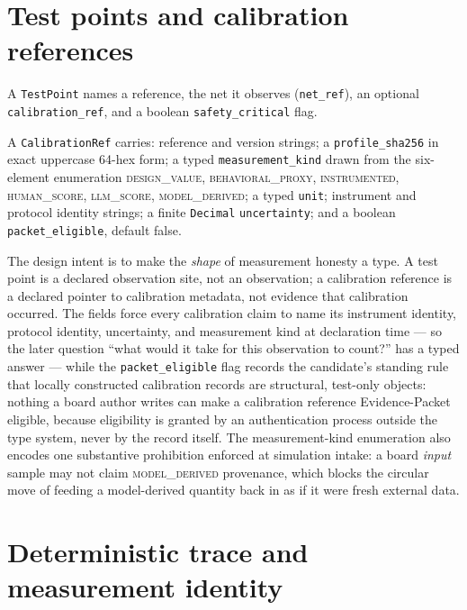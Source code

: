 \section{Test points and calibration references}\label{ch04:sec:tpcal}

\begin{definition}\label{ch04:def:testpoint}
A \texttt{TestPoint} names a reference, the net it observes
(\texttt{net\_ref}), an optional \texttt{calibration\_ref}, and a boolean
\texttt{safety\_critical} flag.
\end{definition}

\begin{definition}\label{ch04:def:calref}
A \texttt{CalibrationRef} carries: reference and version strings; a
\texttt{profile\_sha256} in exact uppercase 64-hex form; a typed
\texttt{measurement\_kind} drawn from the six-element enumeration
\textsc{design\_value}, \textsc{behavioral\_proxy},
\textsc{instrumented}, \textsc{human\_score}, \textsc{llm\_score},
\textsc{model\_derived}; a typed \texttt{unit}; instrument and protocol
identity strings; a finite \texttt{Decimal} \texttt{uncertainty}; and a
boolean \texttt{packet\_eligible}, default false.
\end{definition}

The design intent is to make the \emph{shape} of measurement honesty a
type. A test point is a declared observation site, not an observation; a
calibration reference is a declared pointer to calibration metadata, not
evidence that calibration occurred. The fields force every calibration
claim to name its instrument identity, protocol identity, uncertainty, and
measurement kind at declaration time --- so the later question ``what would
it take for this observation to count?'' has a typed answer --- while the
\texttt{packet\_eligible} flag records the candidate's standing rule that
locally constructed calibration records are structural, test-only objects:
nothing a board author writes can make a calibration reference
Evidence-Packet eligible, because eligibility is granted by an
authentication process outside the type system, never by the record
itself. The measurement-kind enumeration also encodes one substantive
prohibition enforced at simulation intake: a board \emph{input} sample may
not claim \textsc{model\_derived} provenance, which blocks the circular
move of feeding a model-derived quantity back in as if it were fresh
external data.

\section{Deterministic trace and measurement identity}
\label{ch04:sec:traceid}


